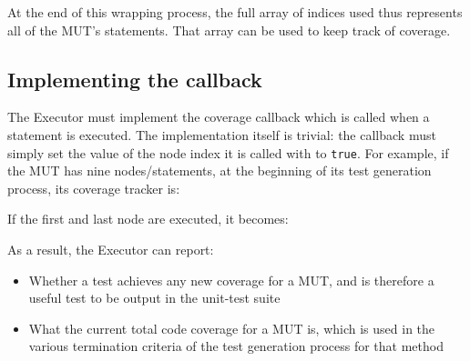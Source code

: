 At the end of this wrapping process, the full array of indices used thus represents all of the MUT's statements. That array can be used to keep track of coverage.

\subsection{Implementing the callback}
The \textsf{Executor} must implement the coverage callback which is called when a statement is executed. The implementation itself is trivial: the callback must simply set the value of the node index it is called with to \texttt{true}. For example, if the MUT has nine nodes/statements, at the beginning of its test generation process, its coverage tracker is:

\begin{code}
\end{code}

\noindent If the first and last node are executed, it becomes:

\begin{code}
\end{code}

As a result, the \textsf{Executor} can report:

\begin{itemize}
   \item Whether a test achieves any new coverage for a MUT, and is therefore a useful test to be output in the unit-test suite
   \item What the current total code coverage for a MUT is, which is used in the various termination criteria of the test generation process for that method
\end{itemize}


